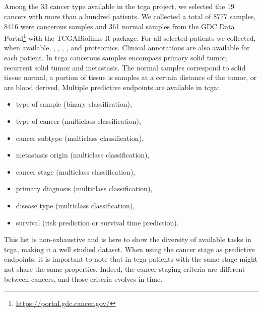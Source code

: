 \documentclass[../main.tex]{subfiles}
\begin{document}
 \subsection{}
     Among the 33 cancer type available in the \gls{tcga} project, we selected the 19 cancers with more than a hundred patients.
     We collected a total of 8777 samples, 8416 were cancerous samples and 361 normal samples from the GDC Data Portal\footnote{\url{https://portal.gdc.cancer.gov/}} with the \textsf{TCGABiolinks} R package.
     For all selected patients we collected, when available, , , , , and proteomics.
     Clinical annotations are also available for each patient.
     In \gls{tcga} cancerous samples encompass primary solid tumor, recurrent solid tumor and metastasis.
     The normal samples correspond to solid tissue normal, a portion of tissue is samples at a certain distance of the tumor, or are blood derived.
     Multiple predictive endpoints are available in \gls{tcga}:
     \begin{itemize}[nosep]
         \item type of sample (binary classification),
         \item type of cancer (multiclass classification),
         \item cancer subtype (multiclass classification),
         \item metastasis origin (multiclass classification),
         \item cancer stage (multiclass classification),
         \item primary diagnosis (multiclass classification),
         \item disease type (multiclass classification),
         \item survival (risk prediction or survival time prediction).
     \end{itemize}
     This list is non-exhaustive and is here to show the diversity of available tasks in \gls{tcga}, making it a well studied dataset.
     When using the cancer stage as predictive endpoints, it is important to note that in \gls{tcga} patients with the same stage might not share the same properties.
     Indeed, the cancer staging criteria are different between cancers, and those criteria evolves in time.

\end{document}
